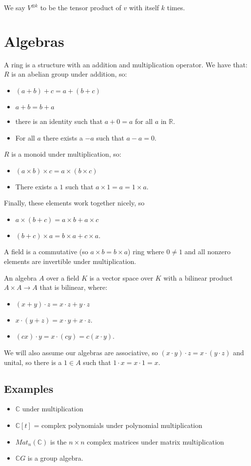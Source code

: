 \documentclass[]{report}
\theoremstyle{definition}
\numberwithin{theorem}{section}
\numberwithin{equation}{section}
\begin{document}
We say $V^{\otimes k}$ to be the tensor product of $v$ with itself $k$ times. 

\section{Algebras}
A ring is a structure with an addition and multiplication operator. We have that:
$R$ is an abelian group under addition, so:
\begin{itemize}
	\item $(a + b) + c = a + (b + c)$
	\item $a + b = b + a$
	\item there is an identity such that $a + 0 = a$ for all $a$ in $\mathbb{R}$.
	\item For all $a$ there exists a $-a$ such that $a - a = 0$. 
\end{itemize}
$R$ is a monoid under multiplication, so:
\begin{itemize}
	\item $(a \times b) \times c = a \times (b \times c)$
	\item There exists a $1$ such that $a \times 1 = a = 1 \times a$.
\end{itemize}
Finally, these elements work together nicely, so
\begin{itemize}
	\item $a \times (b + c) = a \times b + a \times c$
	\item $(b + c) \times a = b \times a + c \times a$. 
\end{itemize}

A field is a commutative (so $a \times b = b \times a$) ring where $0 \neq 1$ and all nonzero elements are invertible under multiplication.

An algebra $A$ over a field $K$ is a vector space over $K$ with a bilinear product $A \times A \rightarrow A$ that is bilinear, where:
\begin{itemize}
	\item $(x + y) \cdot z = x \cdot z + y \cdot z$
	\item $x  \cdot (y + z) = x \cdot y + x \cdot z$.
	\item $(cx) \cdot y = x \cdot (cy) = c (x \cdot y)$.
\end{itemize}
We will also assume our algebras are associative, so $(x \cdot y) \cdot z = x \cdot (y \cdot z)$ and unital, so there is a $1 \in A$ such that $1 \cdot x = x \cdot 1 = x$.

\subsection{Examples}
\begin{itemize}
	\item $\mathbb{C}$ under multiplication
	\item $\mathbb{C}[t]$ = complex polynomials under polynomial multiplication
	\item $Mat_n(\mathbb{C})$ is the $n \times n$ complex matrices under matrix multiplication
	\item $\mathbb{C} G$ is a group algebra.
\end{itemize}
\end{document}

